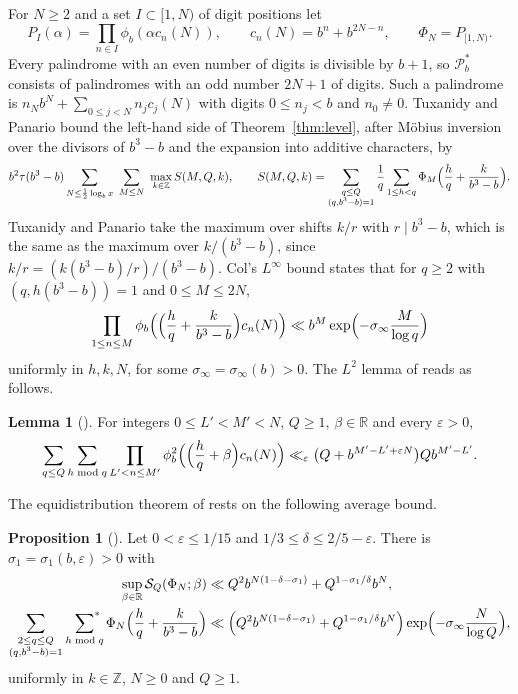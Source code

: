 \documentclass[11pt]{amsart}
\theoremstyle{definition}
\newtheorem{proposition}[theorem]{Proposition}
\newtheorem{lemma}[theorem]{Lemma}
\numberwithin{equation}{section}
\newcommand{\R}{\mathbb{R}}
\newcommand{\Z}{\mathbb{Z}}
\newcommand{\PP}{\mathscr{P}}
\newcommand{\sumstar}{\sideset{}{^*}\sum}
\newcommand{\FS}{\mathcal{S}}
\begin{document}
For $N\ge2$ and a set $I\subset[1,N)$ of digit positions let
\[
P_I(\alpha)=\prod_{n\in I}\phi_b(\alpha c_n(N)),\qquad c_n(N)=b^n+b^{2N-n},\qquad \Phi_N=P_{[1,N)} .
\]
Every palindrome with an even number of digits is divisible by $b+1$, so $\PP_b^*$ consists of palindromes with an odd number $2N+1$ of digits. Such a palindrome is $n_Nb^N+\sum_{0\le j<N}n_jc_j(N)$ with digits $0\le n_j<b$ and $n_0\ne0$. Tuxanidy and Panario \cite[Sect.~6, Sect.~9]{TP} bound the left-hand side of Theorem~\ref{thm:level}, after M\"obius inversion over the divisors of $b^3-b$ and the expansion into additive characters, by
\begin{equation}\label{eq:SMQk}
b^2\tau(b^3-b)\sum_{N\le\frac12\log_bx}\ \sum_{M\le N}\ \max_{k\in\Z}S(M,Q,k),
\qquad
S(M,Q,k)=\sum_{\substack{q\le Q\\(q,b^3-b)=1}}\frac1q\sum_{1\le h<q}\Phi_M\Bigl(\frac hq+\frac{k}{b^3-b}\Bigr).
\end{equation}
Tuxanidy and Panario take the maximum over shifts $k/r$ with $r\mid b^3-b$, which is the same as the maximum over $k/(b^3-b)$, since $k/r=(k(b^3-b)/r)/(b^3-b)$. Col's $L^\infty$ bound \cite[Prop.~6.2]{TP} states that for $q\ge2$ with $(q,h(b^3-b))=1$ and $0\le M\le2N$,
\begin{equation}\label{eq:Col}
\prod_{1\le n\le M}\phi_b\Bigl(\Bigl(\frac hq+\frac{k}{b^3-b}\Bigr)c_n(N)\Bigr)\ll b^M\exp\Bigl(-\sigma_\infty\frac{M}{\log q}\Bigr)
\end{equation}
uniformly in $h,k,N$, for some $\sigma_\infty=\sigma_\infty(b)>0$. The $L^2$ lemma of \cite{TP} reads as follows.

\begin{lemma}[{\cite[Lemma~8.2]{TP}}]\label{lem:L2}
For integers $0\le L'<M'<N$, $Q\ge1$, $\beta\in\R$ and every $\varepsilon>0$,
\[
\sum_{q\le Q}\sum_{h\bmod q}\prod_{L'<n\le M'}\phi_b^2\Bigl(\Bigl(\frac hq+\beta\Bigr)c_n(N)\Bigr)\ll_\varepsilon\bigl(Q+b^{M'-L'+\varepsilon N}\bigr)Qb^{M'-L'}.
\]
\end{lemma}

The equidistribution theorem of \cite{TP} rests on the following average bound.

\begin{proposition}[{\cite[Prop.~8.1]{TP}}]\label{prop:TP81}
Let $0<\varepsilon\le1/15$ and $1/3\le\delta\le2/5-\varepsilon$. There is $\sigma_1=\sigma_1(b,\varepsilon)>0$ with
\begin{align}
\sup_{\beta\in\R}\FS_Q(\Phi_N;\beta)&\ll Q^2b^{N(1-\delta-\sigma_1)}+Q^{1-\sigma_1/\delta}b^N,\label{eq:81a}\\
\sum_{\substack{2\le q\le Q\\(q,b^3-b)=1}}\ \sumstar_{h\bmod q}\Phi_N\Bigl(\frac hq+\frac{k}{b^3-b}\Bigr)&\ll\Bigl(Q^2b^{N(1-\delta-\sigma_1)}+Q^{1-\sigma_1/\delta}b^N\Bigr)\exp\Bigl(-\sigma_\infty\frac{N}{\log Q}\Bigr),\label{eq:81b}
\end{align}
uniformly in $k\in\Z$, $N\ge0$ and $Q\ge1$.
\end{proposition}
\end{document}
